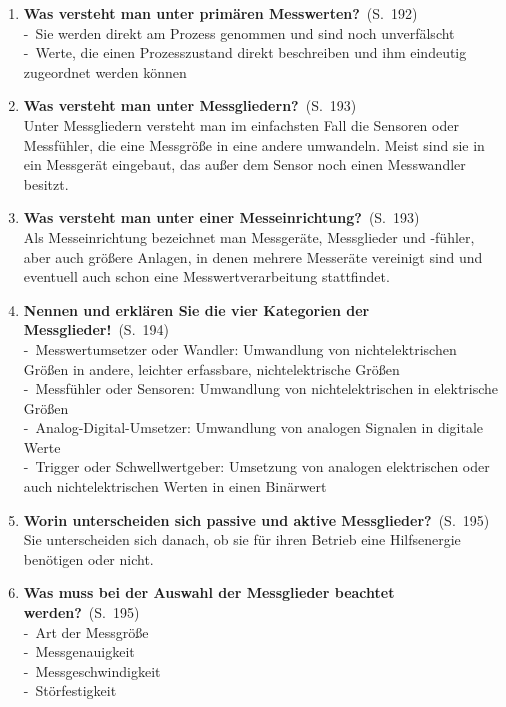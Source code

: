 \documentclass[a4paper,12pt]{article}
\newcommand{\question}[3]{\pagebreak[3]\item {\textbf{#1?}}\ (S.\ #2)#3}
\newcommand{\statement}[3]{\pagebreak[3]\item {\textbf{#1!}}\ (S.\ #2)#3}
\newcommand{\catchword}[1]{\\-\ #1}
\newcommand{\normaltext}[1]{\\#1}
\newcommand{\page}[1]{#1}
\begin{document}
\begin{enumerate}
  \question{Was versteht man unter primären Messwerten}{\page{192}}
  {
    \catchword{Sie werden direkt am Prozess genommen und sind noch unverfälscht}
    \catchword{Werte, die einen Prozesszustand direkt beschreiben und ihm eindeutig zugeordnet
               werden können}
  }

  \question{Was versteht man unter Messgliedern}{\page{193}}
  {
    \normaltext{Unter Messgliedern versteht man im einfachsten Fall die Sensoren oder Messfühler,
                die eine Messgröße in eine andere umwandeln. Meist sind sie in ein Messgerät
                eingebaut, das außer dem Sensor noch einen Messwandler besitzt.}
  }

  \question{Was versteht man unter einer Messeinrichtung}{\page{193}}
  {
    \normaltext{Als Messeinrichtung bezeichnet man Messgeräte, Messglieder und -fühler,
                aber auch größere Anlagen, in denen mehrere Messeräte vereinigt sind
                und eventuell auch schon eine Messwertverarbeitung stattfindet.}
  }

  \statement{Nennen und erklären Sie die vier Kategorien der Messglieder}{\page{194}}
  {
    \catchword{Messwertumsetzer oder Wandler: Umwandlung von nichtelektrischen Größen in andere,
               leichter erfassbare, nichtelektrische Größen}
    \catchword{Messfühler oder Sensoren: Umwandlung von nichtelektrischen in elektrische Größen}
    \catchword{Analog-Digital-Umsetzer: Umwandlung von analogen Signalen in digitale Werte}
    \catchword{Trigger oder Schwellwertgeber: Umsetzung von analogen elektrischen oder auch
               nichtelektrischen Werten in einen Binärwert}
  }

  \question{Worin unterscheiden sich passive und aktive Messglieder}{\page{195}}
  {
    \normaltext{Sie unterscheiden sich danach, ob sie für ihren Betrieb eine Hilfsenergie
                benötigen oder nicht.}
  }

  \question{Was muss bei der Auswahl der Messglieder beachtet werden}{\page{195}}
  {
    \catchword{Art der Messgröße}
    \catchword{Messgenauigkeit}
    \catchword{Messgeschwindigkeit}
    \catchword{Störfestigkeit}
  }


\end{enumerate}
\end{document}

